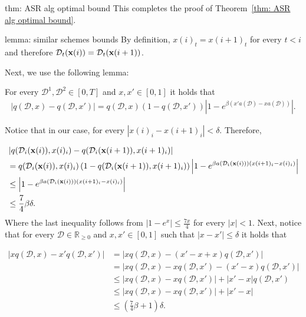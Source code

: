 \begin{proofof}{thm: ASR alg optimal bound}
This completes the proof of Theorem~\ref{thm: ASR alg optimal bound}.
\end{proofof}

\begin{proofof}{lemma: similar schemes bounds}
By definition, $x(i)_t = x(i+1)_t$ for every $t < i$ and therefore $\mathcal{D}_t({\bf{x}}(i)) = \mathcal{D}_t({\bf{x}}(i+1))$.

Next, we use the following lemma:
\begin{lemma} \label{lemma: q equality ref}
For every $\mathcal{D}^1, \mathcal{D}^2 \in [0, T]$ and $x, x' \in [0, 1]$ it holds that
\begin{align*}
\left| q(\mathcal{D}, x) - q(\mathcal{D}, x') \right| = q(\mathcal{D}, x) \left(1-q(\mathcal{D}, x')\right) \left| 1 - e^{\beta \left(x' a(\mathcal{D}) - x a(\mathcal{D}) \right)} \right|.
\end{align*}
\end{lemma}

Notice that in our case, for every $\left| x(i)_i - x(i+1)_i \right| < \delta$. Therefore,

\begin{align*}
& \left| q(\mathcal{D}_i({\bf{x}}(i)), x(i)_i) - q(\mathcal{D}_i({\bf{x}}(i+1)), x(i+1)_i) \right| \\
&= q(\mathcal{D}_i({\bf{x}}(i)), x(i)_i) \left(1-q(\mathcal{D}_i({\bf{x}}(i+1)), x(i+1)_i)\right) \left| 1 - e^{\beta a(\mathcal{D}_i({\bf{x}}(i))) \left(x(i+1)_i - x(i)_i \right)} \right| \\
&\leq \left| 1 - e^{\beta a(\mathcal{D}_i({\bf{x}}(i))) \left(x(i+1)_i - x(i)_i \right)} \right| \\
&\leq \frac{7}{4} \beta \delta.
\end{align*}
Where the last inequality follows from $\left|1 - e^x \right| \leq \frac{7x}{4}$ for every $\left| x \right| < 1$. Next, notice that for every $\mathcal{D} \in \mathbb{R}_{\geq 0}$ and $x, x' \in [0, 1]$ such that $\left|x - x'\right| \leq \delta$ it holds that

\begin{align*}
\left| xq(\mathcal{D}, x) - x'q(\mathcal{D}, x') \right| &= \left| xq(\mathcal{D}, x) - \left(x' -x + x \right)q(\mathcal{D}, x') \right| \\
&= \left| xq(\mathcal{D}, x) - xq(\mathcal{D}, x') - \left(x' -x\right)q(\mathcal{D}, x') \right| \\
&\leq \left| xq(\mathcal{D}, x) - xq(\mathcal{D}, x') \right| + \left|x' -x\right| q(\mathcal{D}, x') \\
&\leq \left| xq(\mathcal{D}, x) - xq(\mathcal{D}, x') \right| + \left|x' -x\right| \\
&\leq \left(\frac{7}{4}\beta + 1\right) \delta.
\end{align*}


\end{proofof}

